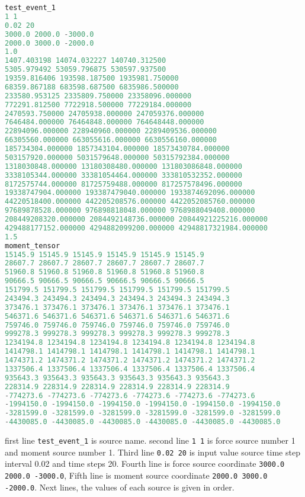 \begin{lstlisting}[language=python, title=source.valsrc, frame=tb]
test_event_1
1 1
0.02 20 
3000.0 2000.0 -3000.0
2000.0 3000.0 -2000.0
1.0
1407.403198 14074.032227 140740.312500
5305.979492 53059.796875 530597.937500
19359.816406 193598.187500 1935981.750000
68359.867188 683598.687500 6835986.500000
233580.953125 2335809.750000 23358096.000000
772291.812500 7722918.500000 77229184.000000
2470593.750000 24705938.000000 247059376.000000
7646484.000000 76464848.000000 764648448.000000
22894096.000000 228940960.000000 2289409536.000000
66305560.000000 663055616.000000 6630556160.000000
185734304.000000 1857343104.000000 18573430784.000000
503157920.000000 5031579648.000000 50315792384.000000
1318030848.000000 13180308480.000000 131803086848.000000
3338105344.000000 33381054464.000000 333810532352.000000
8172575744.000000 81725759488.000000 817257578496.000000
19338747904.000000 193387479040.000000 1933874692096.000000
44220518400.000000 442205208576.000000 4422052085760.000000
97689878528.000000 976898818048.000000 9768988049408.000000
208449208320.000000 2084492148736.000000 20844921225216.000000
429488177152.000000 4294882099200.000000 42948817321984.000000
1.5
moment_tensor
15145.9 15145.9 15145.9 15145.9 15145.9 15145.9
28607.7 28607.7 28607.7 28607.7 28607.7 28607.7
51960.8 51960.8 51960.8 51960.8 51960.8 51960.8
90666.5 90666.5 90666.5 90666.5 90666.5 90666.5
151799.5 151799.5 151799.5 151799.5 151799.5 151799.5
243494.3 243494.3 243494.3 243494.3 243494.3 243494.3
373476.1 373476.1 373476.1 373476.1 373476.1 373476.1
546371.6 546371.6 546371.6 546371.6 546371.6 546371.6
759746.0 759746.0 759746.0 759746.0 759746.0 759746.0
999278.3 999278.3 999278.3 999278.3 999278.3 999278.3
1234194.8 1234194.8 1234194.8 1234194.8 1234194.8 1234194.8
1414798.1 1414798.1 1414798.1 1414798.1 1414798.1 1414798.1
1474371.2 1474371.2 1474371.2 1474371.2 1474371.2 1474371.2
1337506.4 1337506.4 1337506.4 1337506.4 1337506.4 1337506.4
935643.3 935643.3 935643.3 935643.3 935643.3 935643.3
228314.9 228314.9 228314.9 228314.9 228314.9 228314.9
-774273.6 -774273.6 -774273.6 -774273.6 -774273.6 -774273.6
-1994150.0 -1994150.0 -1994150.0 -1994150.0 -1994150.0 -1994150.0
-3281599.0 -3281599.0 -3281599.0 -3281599.0 -3281599.0 -3281599.0
-4430085.0 -4430085.0 -4430085.0 -4430085.0 -4430085.0 -4430085.0
\end{lstlisting}

first line \texttt{test\_event\_1} is source name. second line \texttt{1 1} is force source number 1 and moment source number 1. Third line \texttt{0.02 20} is input value source time step interval 0.02 and time steps 20. Fourth line is force source coordinate \texttt{3000.0 2000.0 -3000.0}, Fifth line is moment source coordinate \texttt{2000.0 3000.0 -2000.0}. Next lines, the values of each source is given in order.

